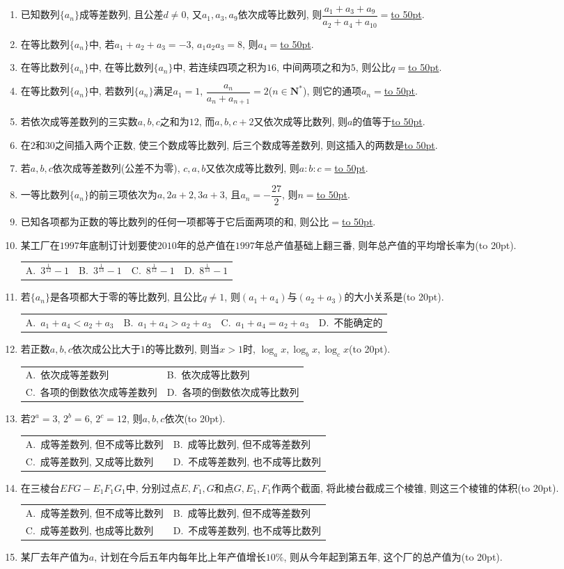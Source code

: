 \documentclass[10pt,a4paper]{article}
\newcommand{\blank}[1]{\underline{\hbox to #1pt{}}}
\newcommand{\bracket}[1]{(\hbox to #1pt{})}
\newcommand{\twoch}[4]{\par\begin{tabular}{p{.46\textwidth}p{.46\textwidth}}
A.~#1& B.~#2\\
C.~#3& D.~#4
\end{tabular}}
\newcommand{\fourch}[4]{\par\begin{tabular}{p{.23\textwidth}p{.23\textwidth}p{.23\textwidth}p{.23\textwidth}}
A.~#1 &B.~#2& C.~#3& D.~#4
\end{tabular}}
\begin{document}
\begin{enumerate}[1.]
\item 已知数列$\{a_n\}$成等差数列, 且公差$d\ne 0$, 又$a_1,a_3,a_9$依次成等比数列, 则$\dfrac{a_1+a_3+a_9}{a_2+a_4+a_{10}}=$\blank{50}.
\item 在等比数列$\{a_n\}$中, 若$a_1+a_2+a_3=-3$, $a_1a_2a_3=8$, 则$a_4=$\blank{50}.
\item 在等比数列$\{a_n\}$中, 在等比数列$\{a_n\}$中, 若连续四项之积为$16$, 中间两项之和为$5$, 则公比$q=$\blank{50}.
\item 在等比数列$\{a_n\}$中, 若数列$\{a_n\}$满足$a_1=1$, $\dfrac{a_n}{a_n+a_{n+1}}=2$($n\in \mathbf{N}^*$), 则它的通项$a_n=$\blank{50}.
\item 若依次成等差数列的三实数$a,b,c$之和为$12$, 而$a,b,c+2$又依次成等比数列, 则$a$的值等于\blank{50}.
\item 在$2$和$30$之间插入两个正数, 使三个数成等比数列, 后三个数成等差数列, 则这插入的两数是\blank{50}.
\item 若$a,b,c$依次成等差数列(公差不为零), $c,a,b$又依次成等比数列, 则$a:b:c=$\blank{50}.
\item 一等比数列$\{a_n\}$的前三项依次为$a,2a+2,3a+3$, 且$a_n=-\dfrac {27}2$, 则$n=$\blank{50}.
\item 已知各项都为正数的等比数列的任何一项都等于它后面两项的和, 则公比$=$\blank{50}.
\item 某工厂在$1997$年底制订计划要使$2010$年的总产值在$1997$年总产值基础上翻三番, 则年总产值的平均增长率为\bracket{20}.
\fourch{$3^{\frac 1{12}}-1$}{$3^{\frac 1{13}}-1$}{$8^{\frac 1{12}}-1$}{$8^{\frac 1{13}}-1$}
\item 若$\{a_n\}$是各项都大于零的等比数列, 且公比$q\ne 1$, 则$(a_1+a_4)$与$(a_2+a_3)$的大小关系是\bracket{20}.
\fourch{$a_1+a_4<a_2+a_3$}{$a_1+a_4>a_2+a_3$}{$a_1+a_4=a_2+a_3$}{不能确定的}
\item 若正数$a,b,c$依次成公比大于$1$的等比数列, 则当$x>1$时, $\log _ax,\log _bx,\log _cx$\bracket{20}.
\twoch{依次成等差数列}{依次成等比数列}{各项的倒数依次成等差数列}{各项的倒数依次成等比数列}
\item 若$2^a=3$, $2^b=6$, $2^c=12$, 则$a,b,c$依次\bracket{20}.
\twoch{成等差数列, 但不成等比数列}{成等比数列, 但不成等差数列}{成等差数列, 又成等比数列}{不成等差数列, 也不成等比数列}
\item 在三棱台$EFG-E_1F_1G_1$中, 分别过点$E,F_1,G$和点$G,E_1,F_1$作两个截面, 将此棱台截成三个棱锥, 则这三个棱锥的体积\bracket{20}.
\twoch{成等差数列, 但不成等比数列}{成等比数列, 但不成等差数列}{成等差数列, 也成等比数列}{不成等差数列, 也不成等比数列}
\item 某厂去年产值为$a$, 计划在今后五年内每年比上年产值增长$10\%$, 则从今年起到第五年, 这个厂的总产值为\bracket{20}.

\end{enumerate}
\end{document}
